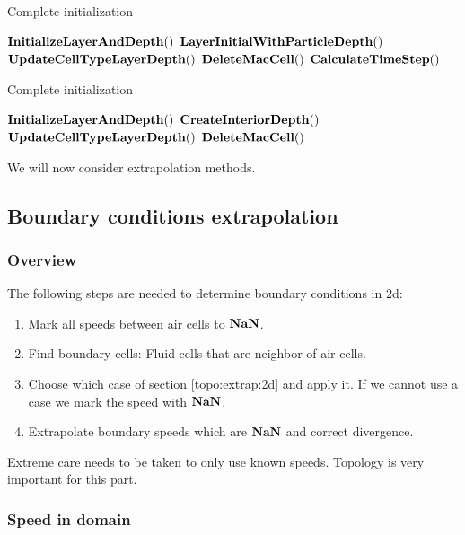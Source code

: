 \begin{algorithm}
\caption{Complete initialization}
\label{code:initialization}
\begin{algorithmic}[1]
\State $\mathop{\textbf{InitializeLayerAndDepth}}()$
\State $\mathop{\textbf{LayerInitialWithParticleDepth}}()$
\State $\mathop{\textbf{UpdateCellTypeLayerDepth}}()$
\State $\mathop{\textbf{DeleteMacCell}}()$
\State $\mathop{\textbf{CalculateTimeStep}}()$
\EndProcedure
\end{algorithmic}
\end{algorithm}

\begin{algorithm}
\caption{Complete initialization}
\label{code:initialization2}
\begin{algorithmic}[1]
\State $\mathop{\textbf{InitializeLayerAndDepth}}()$
\State $\mathop{\textbf{CreateInteriorDepth}}()$
\State $\mathop{\textbf{UpdateCellTypeLayerDepth}}()$
\State $\mathop{\textbf{DeleteMacCell}}()$
\EndProcedure
\end{algorithmic}
\end{algorithm}

We will now consider extrapolation methods.

\subsection{Boundary conditions extrapolation}
\subsubsection{Overview}

The following steps are needed to determine boundary conditions in 2d:
\begin{enumerate}
\item  Mark all speeds between air cells to $\mathop{\textbf{NaN}}$.
 \item Find boundary cells: Fluid cells that are neighbor of air cells.
 \item Choose which case of section \ref{topo:extrap:2d} and apply it. 
 If we cannot use a case we mark the speed with $\mathop{\textbf{NaN}}$.
 \item Extrapolate boundary speeds which are $\mathop{\textbf{NaN}}$ and correct divergence.
\end{enumerate}
Extreme care needs to be taken to only use known speeds. Topology is very important for this part.

\subsubsection{Speed in domain}

